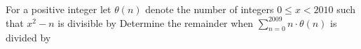 For a positive integer  let $ \theta(n)$ denote the number of integers $ 0 \leq x < 2010$ such that $ x^2 - n$ is divisible by  Determine the remainder when $ \displaystyle \sum_{n = 0}^{2009} n \cdot \theta(n)$ is divided by 